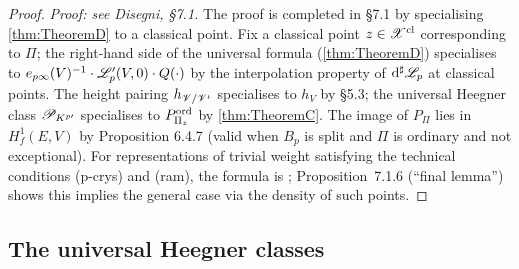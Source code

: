 \begin{proof}
  \textit{Proof: see Disegni, §7.1.}
  The proof is completed in §7.1 by specialising \cref{thm:TheoremD} to a classical point.
  Fix a classical point $z \in \mathscr{X}^{\mathrm{cl}}$ corresponding to $\Pi$; the right-hand
  side of the universal formula (\cref{thm:TheoremD}) specialises to
  $e_{p\infty}(V)^{-1} \cdot \mathscr{L}_p'(V, 0) \cdot Q(\cdot)$ by the interpolation property
  of $\mathrm{d}^\sharp \mathscr{L}_p$ at classical points.  The height pairing
  $h_{\mathscr{V}/\mathscr{V}^\iota}$ specialises to $h_V$ by §5.3; the universal Heegner class
  $\mathscr{P}_{K^{p\prime}}$ specialises to $P^{\mathrm{ord}}_{\Pi_z}$ by \cref{thm:TheoremC}.  The
  image of $P_\Pi$ lies in $H^1_f(E,V)$ by Proposition 6.4.7 (valid when $B_p$ is split
  and $\Pi$ is ordinary and not exceptional).  For representations of trivial weight
  satisfying the technical conditions (p-crys) and (ram), the formula is
  \cite[Theorem~B]{nonsplit}; Proposition~7.1.6 (``final lemma'') shows this implies the
  general case via the density of such points.
\end{proof}

\subsection{The universal Heegner classes}


